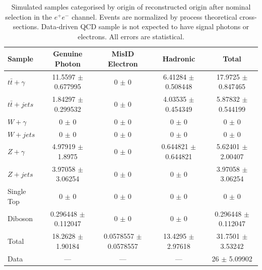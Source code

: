 \begin{table}
\begin{center}
\resizebox{\columnwidth}{!} {
\begin{tabular}{l|ccc|c}
\hline
	\textbf{Sample} & \textbf{Genuine Photon} & \textbf{MisID Electron} & \textbf{Hadronic} & \textbf{Total} \\
\hline
$t\bar{t}+\gamma$  & 11.5597 $\pm$ 0.677995 & 0 $\pm$ 0 & 6.41284 $\pm$ 0.508448 & 17.9725 $\pm$ 0.847465 \\
$t\bar{t}+jets$  & 1.84297 $\pm$ 0.299532 & 0 $\pm$ 0 & 4.03535 $\pm$ 0.454349 & 5.87832 $\pm$ 0.544199 \\
$W+\gamma$  & 0 $\pm$ 0 & 0 $\pm$ 0 & 0 $\pm$ 0 & 0 $\pm$ 0 \\
$W+jets$  & 0 $\pm$ 0 & 0 $\pm$ 0 & 0 $\pm$ 0 & 0 $\pm$ 0 \\
$Z+\gamma$  & 4.97919 $\pm$ 1.8975 & 0 $\pm$ 0 & 0.644821 $\pm$ 0.644821 & 5.62401 $\pm$ 2.00407 \\
$Z+jets$  & 3.97058 $\pm$ 3.06254 & 0 $\pm$ 0 & 0 $\pm$ 0 & 3.97058 $\pm$ 3.06254 \\
Single Top  & 0 $\pm$ 0 & 0 $\pm$ 0 & 0 $\pm$ 0 & 0 $\pm$ 0 \\
Diboson  & 0.296448 $\pm$ 0.112047 & 0 $\pm$ 0 & 0 $\pm$ 0 & 0.296448 $\pm$ 0.112047 \\
\hline
Total  & 18.2628 $\pm$ 1.90184 & 0.0578557 $\pm$ 0.0578557 & 13.4295 $\pm$ 2.97618 & 31.7501 $\pm$ 3.53242 \\
Data  & --- & --- & --- & 26 $\pm$ 5.09902 \\
\hline	
\end{tabular}
}
\end{center}
\caption{Simulated samples categorised by origin of reconstructed origin after nominal selection in the $e^+e^-$ channel. Events are normalized by process theoretical cross-sections. Data-driven QCD sample is not expected to have signal photons or electrons. All errors are statistical.}
\label{tab-SigPhotonsEE}
\end{table}	

